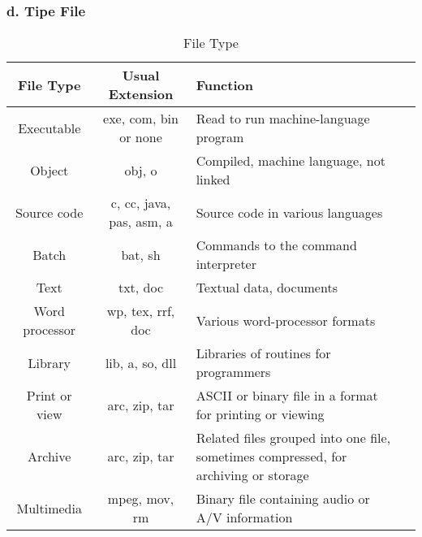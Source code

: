 \documentclass[12pt]{article}
\begin{document}
\subsubsection*{d. Tipe File}

\begin{table}[htbp] %
    \centering
    \begin{tabular}{|c|c|p{4cm}|p{7cm}|} %
    \hline
\textbf{File Type}      & \textbf{Usual Extension}        & \textbf {Function}                                                      \\ \hline
Executable              & exe, com, bin or none           & Read to run machine-language program                                    \\ \hline
Object                  & obj, o                          & Compiled, machine language, not linked                                  \\ \hline
Source code             & c, cc, java, pas, asm, a        & Source code in various languages                                        \\ \hline
Batch                   & bat, sh                         & Commands to the command interpreter                                     \\ \hline
Text                    & txt, doc                        & Textual data, documents                                                 \\ \hline
Word processor          & wp, tex, rrf, doc               & Various word-processor formats                                          \\ \hline
Library                 & lib, a, so, dll                 & Libraries of routines for programmers                                   \\ \hline
Print or view           & arc, zip, tar                   & ASCII or binary file in a format for printing or viewing                \\ \hline
Archive                 & arc, zip, tar                   & Related files grouped into one file, sometimes compressed, for archiving or storage \\ \hline
Multimedia              & mpeg, mov, rm                   & Binary file containing audio or A/V information                         \\ \hline
\end{tabular}
    \caption{File Type}
    \label{tab:your_label}
\end{table}
\end{document}
